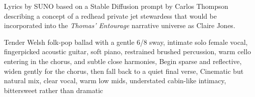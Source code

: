 
\begin{notes}
Lyrics by SUNO based on a Stable Diffusion prompt by Carlos Thompson describing a concept of a redhead private jet stewardess %
that would be incorporated into the \emph{Thomas’ Entourage} narrative universe as Claire Jones.
\end{notes}
\begin{style}
Tender Welsh folk-pop ballad with a gentle 6/8 sway, intimate solo female vocal, fingerpicked acoustic guitar, soft piano, restrained brushed percussion, warm cello entering in the chorus, and subtle close harmonies, Begin sparse and reflective, widen gently for the chorus, then fall back to a quiet final verse, Cinematic but natural mix, clear vocal, warm low mids, understated cabin-like intimacy, bittersweet rather than dramatic
\end{style}
